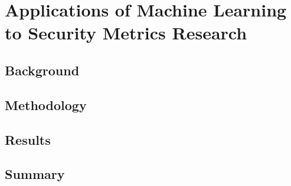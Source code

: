

\chapter{Applications of Machine Learning to Security Metrics Research}\label{ch:ml}



\section{Background}\label{sec:ml:background}



\section{Methodology}\label{sec:ml:methodology}



\section{Results}\label{sec:ml:results}



\section{Summary}\label{sec:ml:summary}



